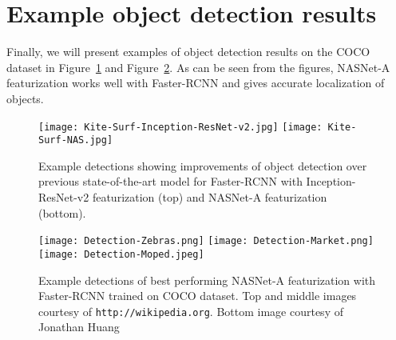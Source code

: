 \documentclass[10pt,twocolumn,letterpaper]{article}
\begin{document}
\section{Example object detection results}\label{sec:object_detection}
Finally, we will present examples of object detection results on the COCO dataset in  Figure~\ref{figure:object-detection} and Figure~\ref{figure:object-detection-examples}. As can be seen from the figures, NASNet-A featurization works well with Faster-RCNN and gives accurate localization of objects.

\iffalse\begin{figure}[h!]
\begin{center}
\texttt{[image: Kite-Surf-Inception-ResNet-v2.jpg]}
\hfill
\texttt{[image: Kite-Surf-NAS.jpg]}
\caption{Example detections showcasing improvements of object detection over previous state-of-the-art model for Faster-RCNN with Inception-ResNet-v2 featurization \cite{huang2016speed} (top)
and NASNet-A featurization (bottom).
}
\label{figure:object-detection}
\end{center}
\end{figure}\fi\begin{figure}[h!]
\begin{center}
\texttt{[image: Kite-Surf-Inception-ResNet-v2.jpg]}
\hfill
\texttt{[image: Kite-Surf-NAS.jpg]}
\caption{Example detections showing improvements of object detection over previous state-of-the-art model for Faster-RCNN with Inception-ResNet-v2 featurization \cite{huang2016speed} (top)
and NASNet-A featurization (bottom). %
}
\label{figure:object-detection}
\end{center}
\end{figure}\begin{figure}[h!]
\begin{center}
\texttt{[image: Detection-Zebras.png]}
\hfill
\texttt{[image: Detection-Market.png]}
\hfill
\texttt{[image: Detection-Moped.jpeg]}
\caption{Example detections of best performing NASNet-A featurization with Faster-RCNN trained on COCO dataset. Top and middle images courtesy of \texttt{http://wikipedia.org}. Bottom image courtesy of Jonathan Huang}
\label{figure:object-detection-examples}
\end{center}
\end{figure}
\end{document}
